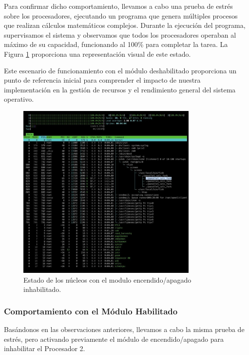 Para confirmar dicho comportamiento, llevamos a cabo una prueba de estrés sobre los procesadores, ejecutando un programa que genera múltiples procesos que realizan cálculos matemáticos complejos. Durante la ejecución del programa, supervisamos el sistema y observamos que todos los procesadores operaban al máximo de su capacidad, funcionando al 100\% para completar la tarea. La Figura \ref{fig:cpuOnOff-load-disabled} proporciona una representación visual de este estado.\par

Este escenario de funcionamiento con el módulo deshabilitado proporciona un punto de referencia inicial para comprender el impacto de nuestra implementación en la gestión de recursos y el rendimiento general del sistema operativo.\par

\begin{figure}[H]
    \centering
    \includegraphics[width=0.8\textwidth]{images/cpuOnOff-load-disabled.png}
    \caption{Estado de los núcleos con el modulo encendido/apagado inhabilitado.}
    \label{fig:cpuOnOff-load-disabled}
\end{figure}

\subsubsection{Comportamiento con el Módulo Habilitado}
Basándonos en las observaciones anteriores, llevamos a cabo la misma prueba de estrés, pero activando previamente el módulo de encendido/apagado para inhabilitar el Procesador 2.\par


